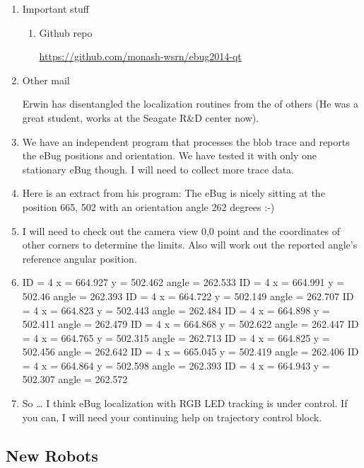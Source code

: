 \documentclass{article}
\begin{document}
\begin{enumerate}
\item Important stuff
\label{sec-2-1-1}

\begin{enumerate}
\item Github repo
\label{sec-2-1-1-1}

\url{https://github.com/monash-wsrn/ebug2014-qt}
\end{enumerate}

\item Other mail
\label{sec-2-1-2}

Erwin has disentangled the localization routines from the of others
(He was a great student, works at the Seagate R\&D center now).

\item 
\label{sec-2-1-3}
We have an independent program that processes the blob trace and
reports the eBug positions and orientation. We have tested it with
only one stationary eBug though. I will need to collect more trace
data.
\item 
\label{sec-2-1-4}
Here is an extract from his program:
The eBug is nicely sitting at the position 665, 502 with an
orientation angle 262 degrees :-)
\item 
\label{sec-2-1-5}
I will need to check out the camera view 0,0 point and the coordinates
of other corners to determine the limits. Also will work out the
reported angle's reference angular position.
\item 
\label{sec-2-1-6}
ID =  4 x = 664.927     y = 502.462     angle = 262.533
ID =  4 x = 664.991     y = 502.46      angle = 262.393
ID =  4 x = 664.722     y = 502.149     angle = 262.707
ID =  4 x = 664.823     y = 502.443     angle = 262.484
ID =  4 x = 664.898     y = 502.411     angle = 262.479
ID =  4 x = 664.868     y = 502.622     angle = 262.447
ID =  4 x = 664.765     y = 502.315     angle = 262.713
ID =  4 x = 664.825     y = 502.456     angle = 262.642
ID =  4 x = 665.045     y = 502.419     angle = 262.406
ID =  4 x = 664.864     y = 502.598     angle = 262.393
ID =  4 x = 664.943     y = 502.307     angle = 262.572
\item 
\label{sec-2-1-7}
So \ldots{} I think eBug localization with RGB LED tracking is under
control. If you can, I will need your continuing help on trajectory
control block.
\end{enumerate}

\subsection{New Robots}
\label{sec-2-2}
\end{document}

